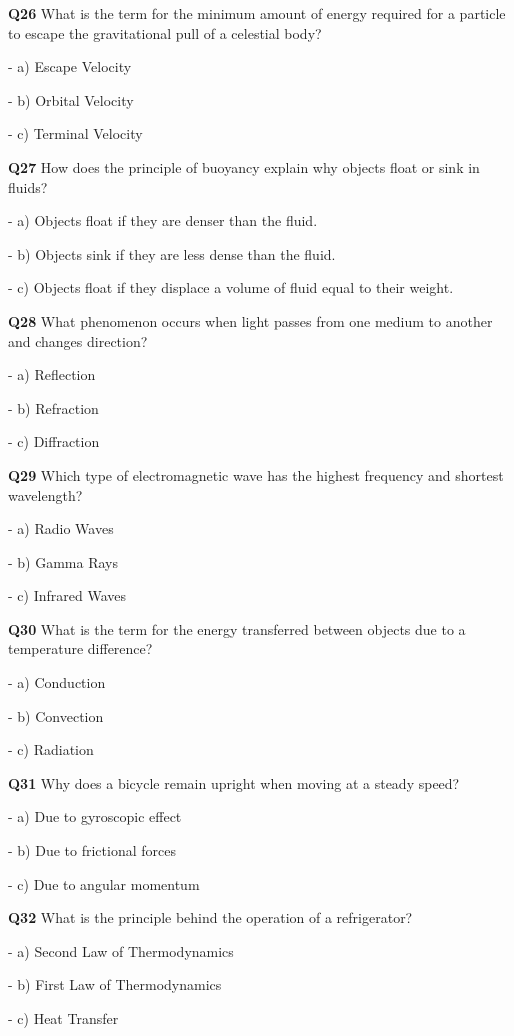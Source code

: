 \textbf{Q26} What is the term for the minimum amount of energy required for a particle to escape the gravitational pull of a celestial body?\par
\quad - a) Escape Velocity\par
\quad - b) Orbital Velocity\par
\quad - c) Terminal Velocity\par

\textbf{Q27} How does the principle of buoyancy explain why objects float or sink in fluids?\par
\quad - a) Objects float if they are denser than the fluid.\par
\quad - b) Objects sink if they are less dense than the fluid.\par
\quad - c) Objects float if they displace a volume of fluid equal to their weight.\par

\textbf{Q28} What phenomenon occurs when light passes from one medium to another and changes direction?\par
\quad - a) Reflection\par
\quad - b) Refraction\par
\quad - c) Diffraction\par

\textbf{Q29} Which type of electromagnetic wave has the highest frequency and shortest wavelength?\par
\quad - a) Radio Waves\par
\quad - b) Gamma Rays\par
\quad - c) Infrared Waves\par

\textbf{Q30} What is the term for the energy transferred between objects due to a temperature difference?\par
\quad - a) Conduction\par
\quad - b) Convection\par
\quad - c) Radiation\par

\textbf{Q31} Why does a bicycle remain upright when moving at a steady speed?\par
\quad - a) Due to gyroscopic effect\par
\quad - b) Due to frictional forces\par
\quad - c) Due to angular momentum\par

\textbf{Q32} What is the principle behind the operation of a refrigerator?\par
\quad - a) Second Law of Thermodynamics\par
\quad - b) First Law of Thermodynamics\par
\quad - c) Heat Transfer\par

